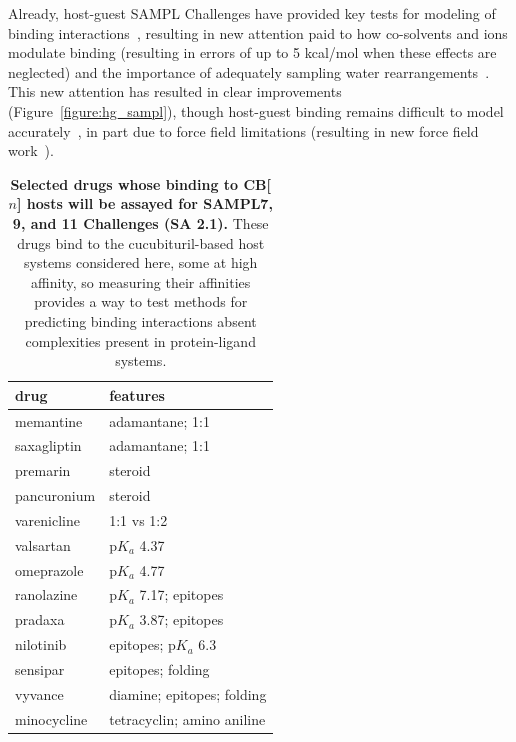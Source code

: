 \documentclass[11pt]{article}
\begin{document}
Already, host-guest SAMPL Challenges have provided key tests for modeling of binding interactions~\cite{Mobley:2017:AnnualReviewofBiophysics}, resulting in new attention paid to how co-solvents and ions modulate binding (resulting in errors of up to 5 kcal/mol when these effects are neglected) and the importance of adequately sampling water rearrangements~\cite{muddana_sampl4_2014, Mobley:2017:AnnualReviewofBiophysics, yin_overview_2016, bhakat_resolving_2016}.
This new attention has resulted in clear improvements (Figure~\ref{figure:hg_sampl}), though host-guest binding remains difficult to model accurately~\cite{henriksen_computational_2015}, in part due to force field limitations (resulting in new force field work~\cite{yin_toward_2015}).

\begin{table}
\vspace{-0.2in}
\footnotesize
\begin{tabular}{l | l}
{\bf drug} & {\bf features} \\
\hline
memantine & adamantane; 1:1 \\
saxagliptin & adamantane; 1:1 \\
premarin & steroid \\
pancuronium & steroid\\
varenicline & 1:1 vs 1:2 \\
valsartan & p$K_a$ 4.37 \\ 
omeprazole & p$K_a$ 4.77 \\
ranolazine & p$K_a$ 7.17; epitopes \\
pradaxa & p$K_a$ 3.87; epitopes \\
nilotinib & epitopes; p$K_a$ 6.3 \\
sensipar & epitopes; folding \\
vyvance & diamine; epitopes; folding \\
minocycline & tetracyclin; amino aniline \\
\end{tabular}
\caption{\textbf{\label{table:CB} Selected drugs whose binding to CB[$n$] hosts will be assayed for SAMPL7, 9, and 11 Challenges (SA 2.1).}  
These drugs bind to the cucubituril-based host systems considered here, some at high affinity, so measuring their affinities provides a way to test methods for predicting binding interactions absent complexities present in protein-ligand systems.
}
\vspace{-0.1in}
\end{table}
\end{document}
